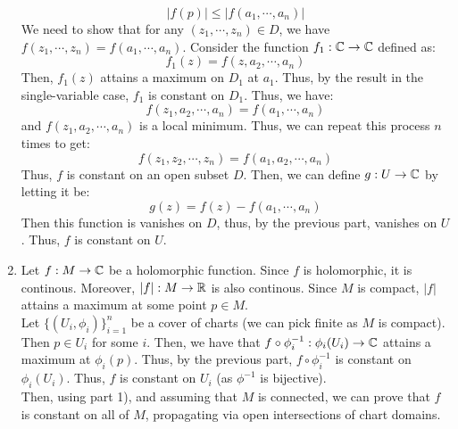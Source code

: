\documentclass[12pt]{article}
\begin{document}
\begin{solution}
\begin{enumerate}
        \[|f(p)| \leq |f(a_1, \cdots, a_n)|\]
        We need to show that for any $(z_1, \cdots, z_n) \in D$, we have $f(z_1, \cdots, z_n) = f(a_1, \cdots, a_n)$. \bbni
        Consider the function $f_1: \mathbb C \to \mathbb C$ defined as:
        \[ f_1(z) = f(z, a_2, \cdots, a_n)\]
        Then, $f_1(z)$ attains a maximum on $D_1$ at $a_1$. Thus, by the result in the single-variable case, $f_1$ is constant on $D_1$. Thus, we have: 
        \[f(z_1, a_2, \cdots, a_n) = f(a_1, \cdots, a_n)\]
        and $f(z_1, a_2, \cdots, a_n)$ is a local minimum. Thus, we can repeat this process $n$ times to get:
        \[f(z_1, z_2, \cdots, z_n) = f(a_1, a_2, \cdots, a_n)\]
        Thus, $f$ is constant on an open subset $D$. Then, we can define $g: U \to \mathbb C$ by letting it be:
        \[g(z) = f(z)-f(a_1, \cdots, a_n)\]
        Then this function is vanishes on $D$, thus, by the previous part, vanishes on $U$. Thus, $f$ is constant on $U$. 
        \item Let $f: M \to \mathbb C$ be a holomorphic function. Since $f$ is holomorphic, it is continous. Moreover, $|f|: M \to \mathbb R$ is also continous. Since $M$ is compact, $|f|$ attains a maximum at some point $p \in M$. \\
        Let $\{(U_i, \phi_i)\}_{i=1}^n$ be a cover of charts (we can pick finite as $M$ is compact). Then $p \in U_i$ for some $i$. Then, we have that $f \circ \phi_i^{-1}: \phi_i(U_i) \to \mathbb C$ attains a maximum at $\phi_i(p)$. Thus, by the previous part, $f \circ \phi_i^{-1}$ is constant on $\phi_i(U_i)$. Thus, $f$ is constant on $U_i$ (as $\phi^{-1}$ is bijective). \\
        Then, using part 1), and assuming that $M$ is connected, we can prove that $f$ is constant on all of $M$, propagating via open intersections of chart domains.
    \end{enumerate}
\end{solution}
\newpage
\end{document}

